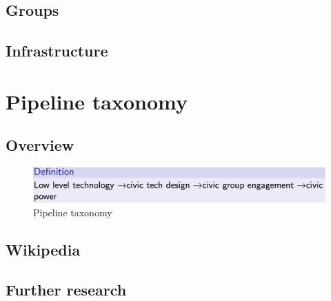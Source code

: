 \documentclass{article}
\begin{document}
        \subsection*{Groups}
        
        
        \subsection*{Infrastructure}
        

\section*{Pipeline taxonomy}

        \subsection*{Overview}
        

			\begin{figure}
				\centering
				\includegraphics[scale=0.5]{images/taxonomy-pipeline}
				\caption{Pipeline taxonomy}
				\label{fig:taxonomy-pipeline}
			\end{figure}

        \subsection*{Wikipedia}
        

        \subsection*{Further research}
        
                
\end{document}
